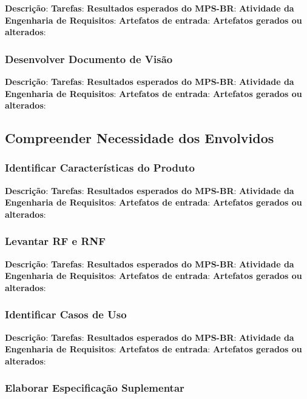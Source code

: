 \textbf{Descrição}:
\textbf{Tarefas}:
\textbf{Resultados esperados do MPS-BR}:
\textbf{Atividade da Engenharia de Requisitos}:
\textbf{Artefatos de entrada}:
\textbf{Artefatos gerados ou alterados}:

\subsubsection{Desenvolver Documento de Visão}

\textbf{Descrição}:
\textbf{Tarefas}:
\textbf{Resultados esperados do MPS-BR}:
\textbf{Atividade da Engenharia de Requisitos}:
\textbf{Artefatos de entrada}:
\textbf{Artefatos gerados ou alterados}:

\subsection{Compreender Necessidade dos Envolvidos}

\subsubsection{Identificar Características do Produto}

\textbf{Descrição}:
\textbf{Tarefas}:
\textbf{Resultados esperados do MPS-BR}:
\textbf{Atividade da Engenharia de Requisitos}:
\textbf{Artefatos de entrada}:
\textbf{Artefatos gerados ou alterados}:

\subsubsection{Levantar RF e RNF}

\textbf{Descrição}:
\textbf{Tarefas}:
\textbf{Resultados esperados do MPS-BR}:
\textbf{Atividade da Engenharia de Requisitos}:
\textbf{Artefatos de entrada}:
\textbf{Artefatos gerados ou alterados}:

\subsubsection{Identificar Casos de Uso}

\textbf{Descrição}:
\textbf{Tarefas}:
\textbf{Resultados esperados do MPS-BR}:
\textbf{Atividade da Engenharia de Requisitos}:
\textbf{Artefatos de entrada}:
\textbf{Artefatos gerados ou alterados}:

\subsubsection{Elaborar Especificação Suplementar}

